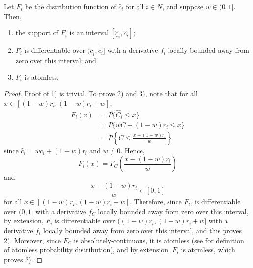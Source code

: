 \begin{propositiona}[\ref{prop:regularity_conditions_indirect}]
Let $F_i$ be the distribution function of $\hat{c}_i$ for all $i\in N$, and suppose $w\in (0,1]$. Then,
\begin{enumerate}
  \item the support of $F_i$ is an interval ${[\underline{\hat{c}}_i, \bar{\hat{c}}_i]}$;
  \item $F_i$ is differentiable over ${(\underline{\hat{c}}_i, \bar{\hat{c}}_i]}$ with a derivative $f_i$ locally bounded away from zero over this interval; and
  \item $F_i$ is atomless.
\end{enumerate}
\end{propositiona}
\begin{proof}
Proof of 1) is trivial. To prove 2) and 3), note that for all $x\in [(1-w)r_i, (1-w)r_i + w]$,
\begin{align}
  F_i(x)
  &= P\{\hat{C}_i\le x\} \\\nonumber
  &= P\{wC + (1-w)r_i\le x\} \\\nonumber
  &= P\left\{ C\le \frac{x - (1-w)r_i}{w} \right\}
\end{align}
since $\hat{c}_i = wc_i + (1-w)r_i$ and $w\neq 0$. Hence,
\begin{equation}
  F_i(x) = F_C\left( \frac{x - (1-w)r_i}{w} \right)
\end{equation}
and
\begin{equation}
  \frac{x - (1-w)r_i}{w}\in [0,1]
\end{equation}
for all $x\in [(1-w)r_i, (1-w)r_i + w]$. Therefore, since $F_C$ is differentiable over $(0,1]$ with a derivative $f_C$ locally bounded away from zero over this interval, by extension, $F_i$ is differentiable over $((1-w)r_i, (1-w)r_i + w]$ with a derivative $f_i$ locally bounded away from zero over this interval, and this proves 2). Moreover, since $F_C$ is absolutely-continuous, it is atomless (see \cite{Atomless,Feller1970} for definition of atomless probability distribution), and by extension, $F_i$ is atomless, which proves 3).
\end{proof}

